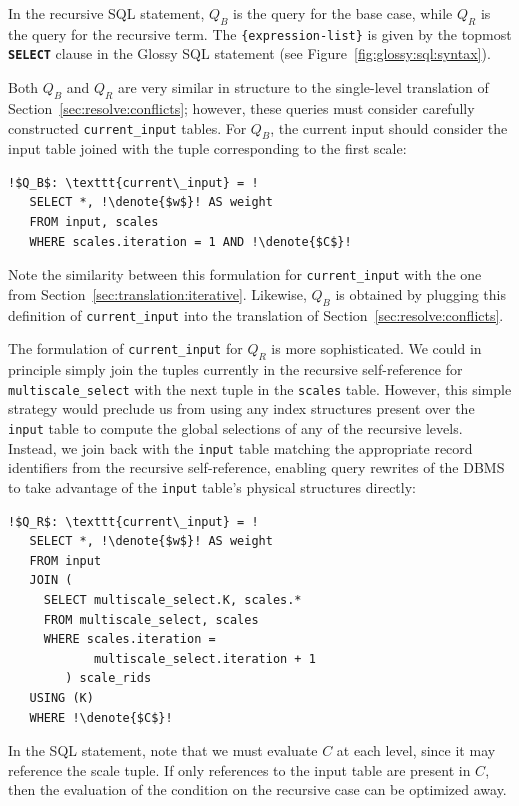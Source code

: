 \documentclass[11pt, oneside]{report}
\newcommand{\denote}[1]{\text{$[\![ $#1$ ]\!]$}}
\begin{document}
In the recursive SQL statement, $Q_B$ is the query for the base case, while $Q_R$ is the query for the recursive term. The \texttt{\{expression-list\}} is given by the topmost \textbf{\texttt{SELECT}} clause in the Glossy SQL statement (see Figure~\ref{fig:glossy:sql:syntax}).    

Both $Q_B$ and $Q_R$ are very similar in structure to the single-level translation of Section~\ref{sec:resolve:conflicts}; however, these queries must consider carefully constructed \texttt{current\_input} tables. For $Q_B$, the current input should consider the input table joined with the tuple corresponding to the first scale:

\begin{lstlisting}[escapechar=!]
  !$Q_B$: \texttt{current\_input} = !
   SELECT *, !\denote{$w$}! AS weight
   FROM input, scales
   WHERE scales.iteration = 1 AND !\denote{$C$}!   
\end{lstlisting}

Note the similarity between this formulation for \texttt{current\_input} with the one from Section~\ref{sec:translation:iterative}. Likewise, $Q_B$ is obtained by plugging this definition of \texttt{current\_input} into the translation of Section~\ref{sec:resolve:conflicts}. 
    
 The formulation of \texttt{current\_input} for $Q_R$ is more sophisticated. We could in principle simply join the tuples currently in the recursive self-reference for \texttt{multiscale\_select} with the next tuple in the \texttt{scales} table. However, this simple strategy would preclude us from using any index structures present over the \texttt{input} table to compute the global selections of any of the recursive levels. Instead, we join back with the \texttt{input} table matching the appropriate record identifiers from the recursive self-reference, enabling query rewrites of the DBMS to take advantage of the \texttt{input} table's physical structures directly:
 
\begin{lstlisting}[escapechar=!]
  !$Q_R$: \texttt{current\_input} = !
   SELECT *, !\denote{$w$}! AS weight
   FROM input
   JOIN (
     SELECT multiscale_select.K, scales.*
     FROM multiscale_select, scales
     WHERE scales.iteration =
            multiscale_select.iteration + 1
        ) scale_rids
   USING (K)
   WHERE !\denote{$C$}! 
\end{lstlisting}
 
In the SQL statement, note that we must evaluate $C$ at each level, since it may reference the scale tuple. If only references to the input table are present in $C$, then the evaluation of the condition on the recursive case can be optimized away.  
\end{document}
